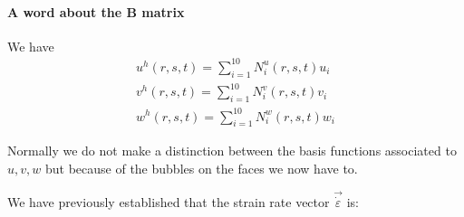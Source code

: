 \paragraph{A word about the ${\bm B}$ matrix} We have  
\begin{eqnarray}
u^h(r,s,t) = \sum_{i=1}^{10} N_i^u(r,s,t) u_i \\
v^h(r,s,t) = \sum_{i=1}^{10} N_i^v(r,s,t) v_i \\
w^h(r,s,t) = \sum_{i=1}^{10} N_i^w(r,s,t) w_i 
\end{eqnarray}

Normally we do not make a distinction between the basis functions 
associated to $u,v,w$ but because of the bubbles on the faces we now have to. 

We have previously established that the strain rate 
vector $\vec{\dot \varepsilon}$ is: 
